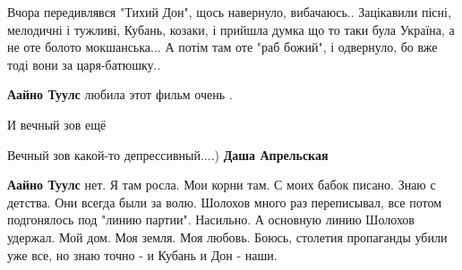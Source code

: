 \begin{itemize}
 

Вчора передивлявся "Тихий Дон", щось навернуло, вибачаюсь.. Зацікавили пісні,
мелодичні і тужливі, Кубань, козаки, і прийшла думка що то таки була Україна, а
не оте болото мокшанська... А потім там оте "раб божий", і одвернуло, бо вже
тоді вони за царя-батюшку..

\begin{itemize}
 
\textbf{Аайно Туулс} любила этот фильм очень .

 
И вечный зов ещё

 
Вечный зов какой-то депрессивный....) \textbf{Даша Апрельская}

 
\textbf{Аайно Туулс} нет. Я там росла. Мои корни там. С моих бабок писано. Знаю
с детства. Они всегда были за волю. Шолохов много раз переписывал, все потом
подгонялось под "линию партии". Насильно. А основную линию Шолохов удержал. Мой
дом. Моя земля. Моя любовь. Боюсь, столетия пропаганды убили уже все, но знаю
точно - и Кубань и Дон - наши.
\end{itemize}

 

\end{itemize}
